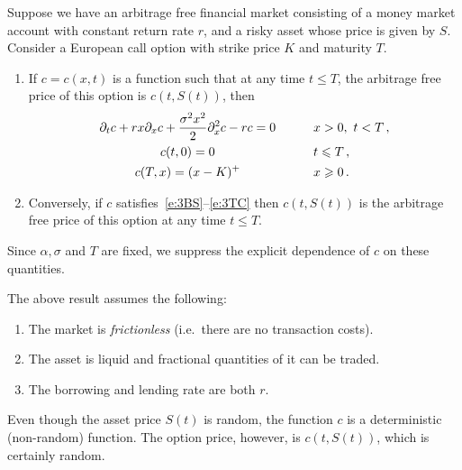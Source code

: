 \begin{theorem}\label{t:3bsm}
  Suppose we have an arbitrage free financial market consisting of a money market account with constant return rate $r$, and a risky asset whose price is given by $S$.
  Consider a European call option with strike price $K$ and maturity $T$.
  \begin{enumerate}
    \item\label{p:3bsm1}
      If $c = c(x, t)$ is a function such that at any time $t \leq T$, the arbitrage free price of this option is $c(t, S(t))$, then
      \begin{alignat}{2}
	\span\label{e:3BS}
	  \partial_t c + r x \partial_x c + \frac{\sigma^2 x^2}{2} \partial_x^2 c - r c
	  = 0
	  &\qquad& x > 0,\ t < T\,,
	\\
	\span\label{e:3cBC}
	  c(t, 0) = 0
	  && t \leq T\,,
	\\
	\span\label{e:3TC}
	  c(T, x) = (x - K)^+
	  && x \geq 0\,.
      \end{alignat}

    \item\label{p:3bsm2}
      Conversely, if $c$ satisfies~\eqref{e:3BS}--\eqref{e:3TC} then $c(t, S(t))$ is the arbitrage free price of this option at any time $t \leq T$.
  \end{enumerate}
\end{theorem}
\begin{remark}
  Since $\alpha, \sigma$ and $T$ are fixed, we suppress the explicit dependence of $c$ on these quantities.
\end{remark}
\begin{remark}
  The above result assumes the following:
  \begin{enumerate}
    \item
      The market is \emph{frictionless} (i.e.\ there are no transaction costs).
    \item
      The asset is liquid and fractional quantities of it can be traded.
    \item
      The borrowing and lending rate are both $r$.
  \end{enumerate}
\end{remark}
\begin{remark}
  Even though the asset price $S(t)$ is random, the function $c$ is a deterministic (non-random) function.
  The option price, however, is $c(t, S(t))$, which is certainly random.
\end{remark}

